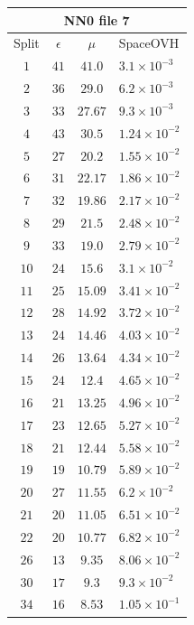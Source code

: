 \documentclass[11pt,a4paper,twoside,
openright]{book}
\begin{document}
		
		\vspace*{0.5 cm}
	\begin{table}
		\begin{tabular}{|c | c | c | l |}
			
			\multicolumn{4}{c}{NN0 file 7} \\
			\hline
			Split & $\epsilon$ & $\mu$ & SpaceOVH \\ \hline
			$1$ & $41$ & $41.0$ & $3.1\times 10^{-3}$ \\ 
			$2$ & $36$ & $29.0$ & $6.2\times 10^{-3}$ \\ 
			$3$ & $33$ & $27.67$ & $9.3\times 10^{-3}$ \\ 
			$4$ & $43$ & $30.5$ & $1.24\times 10^{-2}$ \\ 
			$5$ & $27$ & $20.2$ & $1.55\times 10^{-2}$ \\ 
			$6$ & $31$ & $22.17$ & $1.86\times 10^{-2}$ \\ 
			$7$ & $32$ & $19.86$ & $2.17\times 10^{-2}$ \\ 
			$8$ & $29$ & $21.5$ & $2.48\times 10^{-2}$ \\ 
			$9$ & $33$ & $19.0$ & $2.79\times 10^{-2}$ \\ 
			$10$ & $24$ & $15.6$ & $3.1\times 10^{-2}$ \\ 
			$11$ & $25$ & $15.09$ & $3.41\times 10^{-2}$ \\ 
			$12$ & $28$ & $14.92$ & $3.72\times 10^{-2}$ \\ 
			$13$ & $24$ & $14.46$ & $4.03\times 10^{-2}$ \\ 
			$14$ & $26$ & $13.64$ & $4.34\times 10^{-2}$ \\ 
			$15$ & $24$ & $12.4$ & $4.65\times 10^{-2}$ \\ 
			$16$ & $21$ & $13.25$ & $4.96\times 10^{-2}$ \\ 
			$17$ & $23$ & $12.65$ & $5.27\times 10^{-2}$ \\ 
			$18$ & $21$ & $12.44$ & $5.58\times 10^{-2}$ \\ 
			$19$ & $19$ & $10.79$ & $5.89\times 10^{-2}$ \\ 
			$20$ & $27$ & $11.55$ & $6.2\times 10^{-2}$ \\ 
			$21$ & $20$ & $11.05$ & $6.51\times 10^{-2}$ \\ 
			$22$ & $20$ & $10.77$ & $6.82\times 10^{-2}$ \\ 
			$26$ & $13$ & $9.35$ & $8.06\times 10^{-2}$ \\ 
			$30$ & $17$ & $9.3$ & $9.3\times 10^{-2}$ \\ 
			$34$ & $16$ & $8.53$ & $1.05\times 10^{-1}$ \\ 

\end{tabular}
\end{table}
\end{document}
